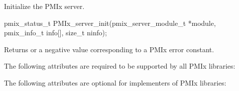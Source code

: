 \summary

Initialize the \ac{PMIx} server.

\format

\cspecificstart
\begin{codepar}
pmix_status_t
PMIx_server_init(pmix_server_module_t *module,
                 pmix_info_t info[], size_t ninfo);
\end{codepar}
\cspecificend

\begin{arglist}
\end{arglist}

Returns  or a negative value corresponding to a PMIx error constant.

\reqattrstart
The following attributes are required to be supported by all \ac{PMIx} libraries:


\reqattrend

\optattrstart
The following attributes are optional for implementers of \ac{PMIx} libraries:

